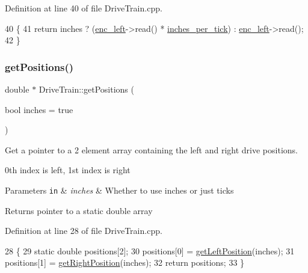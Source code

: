 Definition at line 40 of file Drive\+Train.\+cpp.


\begin{DoxyCode}
40                                                     \{
41     \textcolor{keywordflow}{return} inches ? (\hyperlink{class_drive_train_ab0a54aaa4484970b6890a7c8ebaadf3b}{enc\_left}->read() * \hyperlink{class_drive_train_adc3896c625d516e91add67eedb525440}{inches\_per\_tick}) : 
      \hyperlink{class_drive_train_ab0a54aaa4484970b6890a7c8ebaadf3b}{enc\_left}->read();
42 \}
\end{DoxyCode}
\mbox{\label{class_drive_train_a1fc42308d8fe67dd412303946296e43f}} 
\subsubsection{\texorpdfstring{get\+Positions()}{getPositions()}}
{\footnotesize\ttfamily double $\ast$ Drive\+Train\+::get\+Positions (\begin{DoxyParamCaption}\item[{bool}]{inches = {\ttfamily true} }\end{DoxyParamCaption})}



Get a pointer to a 2 element array containing the left and right drive positions. 

0th index is left, 1st index is right 
\begin{DoxyParams}[1]{Parameters}
\mbox{\tt in}  & {\em inches} & Whether to use inches or just ticks \\
\hline
\end{DoxyParams}
\begin{DoxyReturn}{Returns}
pointer to a static double array 
\end{DoxyReturn}


Definition at line 28 of file Drive\+Train.\+cpp.


\begin{DoxyCode}
28                                             \{
29     \textcolor{keyword}{static} \textcolor{keywordtype}{double} positions[2];
30     positions[0] = \hyperlink{class_drive_train_a9ec0f8309cf9670fec618e8b00f70390}{getLeftPosition}(inches);
31     positions[1] = \hyperlink{class_drive_train_aa52a34fcdfad88883c78b81336661137}{getRightPosition}(inches);
32     \textcolor{keywordflow}{return} positions;
33 \}
\end{DoxyCode}
\mbox{\label{class_drive_train_a9f2a7ed0d2d2b91319a09083a37d236a}} 
